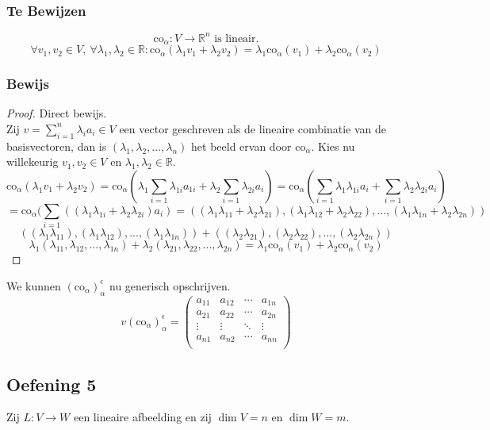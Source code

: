 \documentclass[lineaire_algebra_oplossingen.tex]{subfiles}
\begin{document}
\subsubsection*{Te Bewijzen}
\[\text{co}_\alpha:V\rightarrow \mathbb{R}^n \text{ is lineair.}\]
\[
\forall v_1,v_2 \in V ,\ \forall\lambda_1,\lambda_2\in \mathbb{R}: \text{co}_\alpha(\lambda_1v_1+\lambda_2v_2)=\lambda_1\text{co}_\alpha(v_1)
+\lambda_2\text{co}_\alpha(v_2)
\]
\subsubsection*{Bewijs}
\begin{proof}
Direct bewijs.\\
Zij $v = \sum_{i=1}^n\lambda_ia_i \in V$ een vector geschreven als de lineaire combinatie van de basisvectoren, dan is $(\lambda_1,\lambda_2,...,\lambda_n)$ het beeld ervan door $\text{co}_\alpha$.
Kies nu willekeurig $v_1,v_2 \in V$ en $\lambda_1,\lambda_2\in \mathbb{R}$.
\[
\text{co}_\alpha(\lambda_1v_1+\lambda_2v_2)= \text{co}_\alpha(\lambda_1\sum_{i=1}\lambda_{1i}a_{1i} + \lambda_2\sum_{i=1}\lambda_{2i}a_{i}) = \text{co}_\alpha(\sum_{i=1}\lambda_1\lambda_{1i}a_{i} + \sum_{i=1}\lambda_2\lambda_{2i}a_{i})
\]
\[
= \text{co}_\alpha(\sum_{i=1}((\lambda_1\lambda_{1i}+\lambda_2\lambda_{2i})a_{i}) = ((\lambda_1\lambda_{11}+\lambda_2\lambda_{21}),(\lambda_1\lambda_{12}+\lambda_2\lambda_{22}),...,(\lambda_1\lambda_{1n}+\lambda_2\lambda_{2n}))
\]
\[
((\lambda_1\lambda_{11}),(\lambda_1\lambda_{12}),...,(\lambda_1\lambda_{1n}))+((\lambda_2\lambda_{21}),(\lambda_2\lambda_{22}),...,(\lambda_2\lambda_{2n}))
\]
\[
\lambda_1(\lambda_{11},\lambda_{12},...,\lambda_{1n})+ \lambda_2(\lambda_{21},\lambda_{22},...,\lambda_{2n}) = \lambda_1\text{co}_\alpha(v_1)+\lambda_2\text{co}_\alpha(v_2)
\]
\end{proof}
We kunnen $(\text{co}_\alpha)_\alpha^\epsilon$ nu generisch opschrijven.
\[
v(\text{co}_\alpha)_\alpha^\epsilon = 
\begin{pmatrix}
a_{11} & a_{12} & \cdots & a_{1n}\\
a_{21} & a_{22} & \cdots & a_{2n}\\
\vdots & \vdots & \ddots & \vdots\\
a_{n1} & a_{n2} & \cdots & a_{nn}\\
\end{pmatrix}
\]

\subsection{Oefening 5}
Zij $L:V \rightarrow W$ een lineaire afbeelding en zij $\dim V = n$ en $\dim W = m$.\\
\end{document}
